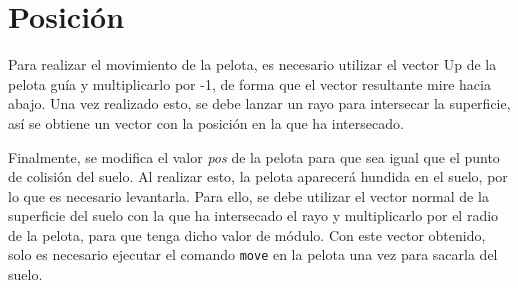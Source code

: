 \section{Posición}

Para realizar el movimiento de la pelota, es necesario utilizar el vector Up de la pelota guía y multiplicarlo por -1, de forma que el vector resultante mire hacia abajo. Una vez realizado esto, se debe lanzar un rayo para intersecar la superficie, así se obtiene un vector con la posición en la que ha intersecado.

\bigskip

Finalmente, se modifica el valor \textit{pos} de la pelota para que sea igual que el punto de colisión del suelo. Al realizar esto, la pelota aparecerá hundida en el suelo, por lo que es necesario levantarla. Para ello, se debe utilizar el vector normal de la superficie del suelo con la que ha intersecado el rayo y multiplicarlo por el radio de la pelota, para que tenga dicho valor de módulo. Con este vector obtenido, solo es necesario ejecutar el comando \verb|move| en la pelota una vez para sacarla del suelo.

